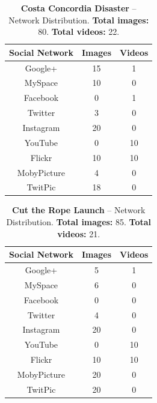 \documentclass{acm_proc_article-sp}
\begin{document}
\begin{table}[htbp]
  \begin{tabular}{ | c | c | c | }
    \hline
    \textbf{Social Network} & \textbf{Images} & \textbf{Videos}\\
    \hline
    Google+ & 15 & 1\\
    MySpace & 10 & 0\\
    Facebook & 0 & 1\\
    Twitter & 3 & 0\\
    Instagram & 20 & 0\\
    YouTube & 0 & 10\\
    Flickr & 10 & 10\\
    MobyPicture & 4 & 0\\
    TwitPic & 18 & 0\\
    \hline
  \end{tabular}
  \label{tab:concordia}
  \caption{\textbf{Costa Concordia Disaster} -- Network Distribution. \textbf{Total images:} 80. \textbf{Total videos:} 22.}
\end{table}

\begin{table}[htbp]
  \begin{tabular}{ | c | c | c | }
    \hline
    \textbf{Social Network} & \textbf{Images} & \textbf{Videos}\\
    \hline
    Google+ & 5 & 1\\
    MySpace & 6 & 0\\
    Facebook & 0 & 0\\
    Twitter & 4 & 0\\
    Instagram & 20 & 0\\
    YouTube & 0 & 10\\
    Flickr & 10 & 10\\ 
    MobyPicture & 20 & 0\\
    TwitPic & 20 & 0\\
    \hline
  \end{tabular}
  \label{tab:rope}
  \caption{\textbf{Cut the Rope Launch} -- Network Distribution. \textbf{Total images:} 85. \textbf{Total videos:} 21.}
\end{table}
\end{document}
